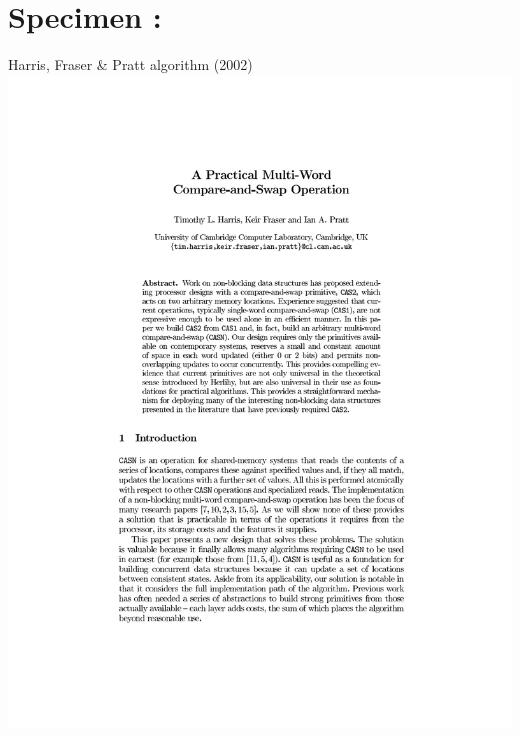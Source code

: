 \section{Specimen  : \Kcas}


\begin{frame}{Harris, Fraser \& Pratt algorithm (2002)}
\centering
\includegraphics[scale=0.5]{images/harris_fraser_pratt_2002.pdf}
\end{frame}


